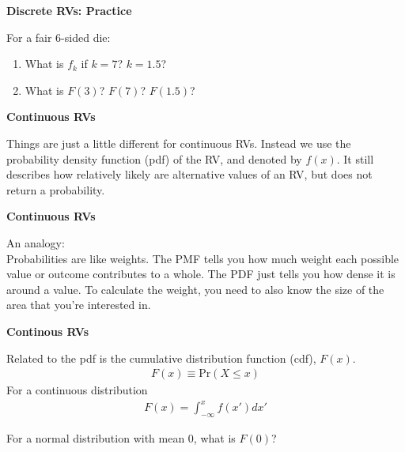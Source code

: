 \documentclass[12pt,xcolor=svgnames]{beamer}
\newcommand{\bl}{\color{blue}}
\newcommand{\theme}{\color{FireBrick}}
\newcommand{\sk}{\vspace{.4cm}}
\newcommand{\nsk}{\vspace{-.4cm}}
\newcommand{\chap}[1]{{\theme \Large \bf #1} \sk}
\newcommand{\pr}{\text{Pr}}
\begin{document}
\begin{frame}
\chap{Discrete RVs: Practice}

For a fair 6-sided die:

\begin{enumerate}
\item What is $f_k$ if $k=7$? $k=1.5$?
\item What is $F(3)$?  $F(7)$? $F(1.5)$?
\end{enumerate}

\end{frame}


\begin{frame}
\chap{Continuous RVs}

Things are just a little different for continuous RVs. Instead we use the {\bl probability density function} (pdf) of the RV, and denoted by $f(x)$. It still describes how relatively likely are alternative values of an RV, but does not return a probability.

\end{frame}

\begin{frame}
\chap{Continuous RVs}

An analogy:\\
\sk
Probabilities are like {\bl weights}. The PMF tells you how much weight each possible value or outcome contributes to a whole. The PDF just tells you how dense it is around a value. To calculate the weight, you need to also know the size of the area that you're interested in. 

\end{frame}


\begin{frame}
\chap{Continous RVs}

Related to the pdf is the {\bl cumulative distribution function} (cdf), $F(x)$. 
\begin{align*}
F(x) \equiv \pr(X \leq x)
\end{align*}
For a continuous distribution
\nsk
\begin{align*}
F(x)= \int_{-\infty}^x f(x')dx'
\end{align*}

For a normal distribution with mean 0, what is $F(0)$? 

\end{frame}
\end{document}
